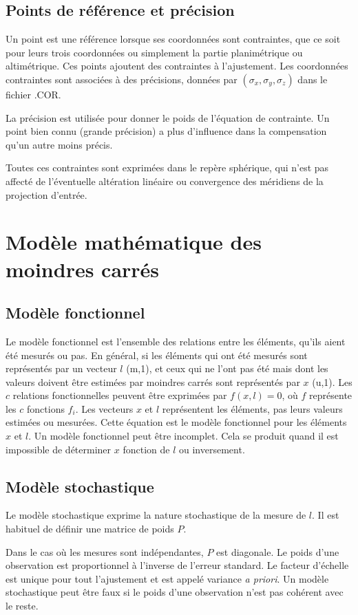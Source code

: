 \documentclass[french]{report}
\begin{document}
\section{Points de référence et précision}
Un point est une référence lorsque ses coordonnées sont contraintes, que ce soit pour leurs trois coordonnées ou simplement la partie planimétrique ou altimétrique. Ces points ajoutent des contraintes à l'ajustement. Les coordonnées contraintes sont associées à des précisions, données par $(\sigma_x,\sigma_y,\sigma_z)$ dans le fichier .COR.

La précision est utilisée pour donner le poids de l'équation de contrainte. Un point bien connu (grande précision) a plus d'influence dans la compensation qu'un autre moins précis.

Toutes ces contraintes sont exprimées dans le repère sphérique, qui n'est pas affecté de l'éventuelle altération linéaire ou convergence des méridiens de la projection d'entrée.



\chapter{Modèle mathématique des moindres carrés}
\section{Modèle fonctionnel}
Le modèle fonctionnel est l'ensemble des relations entre les éléments, qu'ils aient été mesurés ou pas. En général, si les éléments qui ont été mesurés sont
représentés par un vecteur $l$ (m,1), et ceux qui ne l'ont pas été mais dont les valeurs doivent être estimées par moindres carrés sont représentés par $x$ (u,1).
Les $c$ relations fonctionnelles peuvent être exprimées par $f(x,l)=0$,
où $f$ représente les $c$ fonctions $f_i$. Les vecteurs $x$ et $l$ représentent les éléments, pas leurs valeurs estimées ou mesurées.
Cette équation est le modèle fonctionnel pour les éléments $x$ et $l$.
Un modèle fonctionnel peut être incomplet. Cela se produit quand il est impossible de déterminer $x$ fonction de $l$ ou inversement.

\section{Modèle stochastique}
Le modèle stochastique exprime la nature stochastique de la mesure de $l$. Il est habituel de définir une matrice de poids $P$.

Dans le cas où les mesures sont indépendantes, $P$ est diagonale. Le poids d'une observation est proportionnel à l'inverse de l'erreur standard.
Le facteur d'échelle est unique pour tout l'ajustement et est appelé variance \textit{a priori}.
Un modèle stochastique peut être faux si le poids d'une observation n'est pas cohérent avec le reste.
\end{document}
